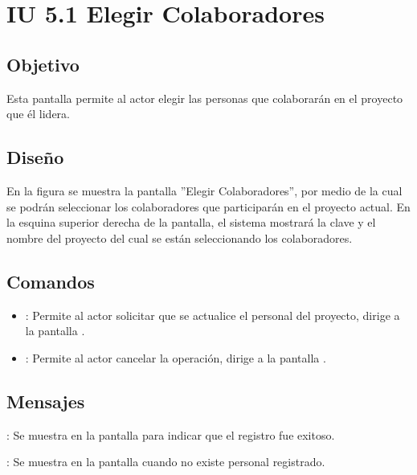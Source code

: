 \section{IU 5.1 Elegir Colaboradores}

\subsection{Objetivo}
	Esta pantalla permite al actor elegir las personas que colaborarán en el proyecto que él lidera.
\subsection{Diseño}
	En la figura  se muestra la pantalla ''Elegir Colaboradores'', por medio de la cual se podrán seleccionar los colaboradores que participarán en el proyecto actual. En la esquina superior derecha de la pantalla, el sistema mostrará la clave y el nombre del proyecto del cual se están seleccionando los colaboradores.

\subsection{Comandos}
\begin{itemize}
	\item {}: Permite al actor solicitar que se actualice el personal del proyecto, dirige a la pantalla .
	\item {}: Permite al actor cancelar la operación, dirige a la pantalla .
\end{itemize}

\subsection{Mensajes}

\begin{Citemize}
	\item {}: Se muestra en la pantalla  para indicar que el registro fue exitoso.
	\item {}: Se muestra en la pantalla  cuando no existe personal registrado.
\end{Citemize}
